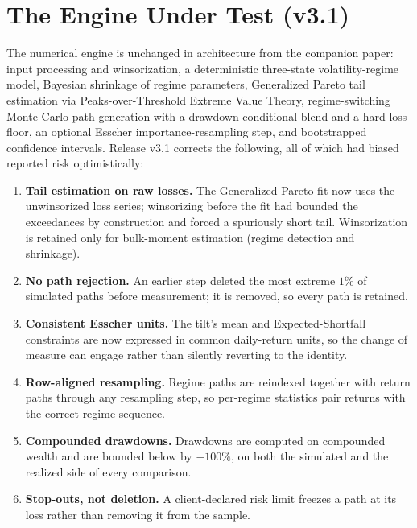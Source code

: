 \documentclass[11pt]{article}
\begin{document}
\section{The Engine Under Test (v3.1)}
\label{sec:engine}

The numerical engine is unchanged in architecture from the companion paper: input
processing and winsorization, a deterministic three-state volatility-regime model,
Bayesian shrinkage of regime parameters, Generalized Pareto tail estimation via
Peaks-over-Threshold Extreme Value Theory, regime-switching Monte Carlo path
generation with a drawdown-conditional blend and a hard loss floor, an optional
Esscher importance-resampling step, and bootstrapped confidence intervals. Release
v3.1 corrects the following, all of which had biased reported risk optimistically:

\begin{enumerate}[leftmargin=1.6em, itemsep=2pt]
  \item \textbf{Tail estimation on raw losses.} The Generalized Pareto fit now
  uses the unwinsorized loss series; winsorizing before the fit had bounded the
  exceedances by construction and forced a spuriously short tail. Winsorization is
  retained only for bulk-moment estimation (regime detection and shrinkage).
  \item \textbf{No path rejection.} An earlier step deleted the most extreme $1\%$
  of simulated paths before measurement; it is removed, so every path is retained.
  \item \textbf{Consistent Esscher units.} The tilt's mean and Expected-Shortfall
  constraints are now expressed in common daily-return units, so the change of
  measure can engage rather than silently reverting to the identity.
  \item \textbf{Row-aligned resampling.} Regime paths are reindexed together with
  return paths through any resampling step, so per-regime statistics pair returns
  with the correct regime sequence.
  \item \textbf{Compounded drawdowns.} Drawdowns are computed on compounded wealth
  and are bounded below by $-100\%$, on both the simulated and the realized side of
  every comparison.
  \item \textbf{Stop-outs, not deletion.} A client-declared risk limit freezes a
  path at its loss rather than removing it from the sample.
\end{enumerate}
\end{document}
